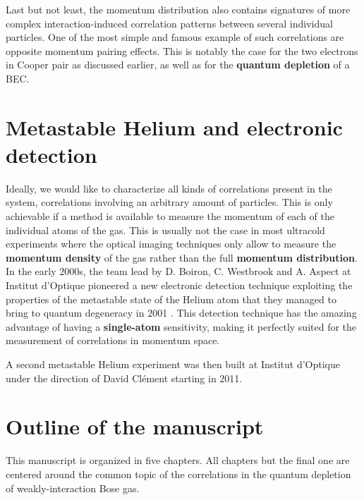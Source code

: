 Last but not least, the momentum distribution also contains signatures of more complex interaction-induced correlation patterns between several individual particles. One of the most simple and famous example of such correlations are opposite momentum pairing effects. This is notably the case for the two electrons in Cooper pair as discussed earlier, as well as for the \textbf{quantum depletion} of a BEC. 

\section*{Metastable Helium and electronic detection}

Ideally, we would like to characterize all kinds of correlations present in the system, \ie correlations involving an arbitrary amount of particles. This is only achievable if a method is available to measure the momentum of each of the individual atoms of the gas. This is usually not the case in most ultracold experiments where the optical imaging techniques only allow to measure the \textbf{momentum density} of the gas rather than the full \textbf{momentum distribution}. In the early 2000s, the team lead by D. Boiron, C. Westbrook and A. Aspect at Institut d'Optique pioneered a new electronic detection technique exploiting the properties of the metastable state of the Helium atom that they managed to bring to quantum degeneracy in 2001 \cite{robert2001bose}. This detection technique has the amazing advantage of having a \textbf{single-atom} sensitivity, making it perfectly suited for the measurement of correlations in momentum space.

A second metastable Helium experiment was then built at Institut d'Optique under the direction of David Clément starting in 2011. 


\section*{Outline of the manuscript}

This manuscript is organized in five chapters. All chapters but the final one are centered around the common topic of the \kmk correlations in the quantum depletion of weakly-interaction Bose gas.

